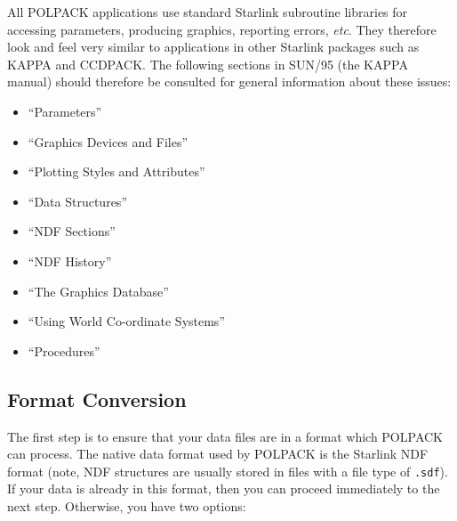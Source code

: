 \documentclass[twoside,11pt]{article}
\newcommand{\xref}[3]{#1}
\newcommand{\xlabel}[1]{}
\renewcommand{\_}{\texttt{\symbol{95}}}
\begin{document}
All POLPACK applications use standard Starlink subroutine libraries for
accessing parameters, producing graphics, reporting errors, \emph{etc}. They
therefore look and feel very similar to applications in other Starlink
packages such as KAPPA and CCDPACK. The following sections in
\xref{SUN/95}{sun95}{} (the KAPPA manual) should therefore be consulted for general
information about these issues:

\begin{itemize}
\item ``\xref{Parameters}{sun95}{se_param}''
\item ``\xref{Graphics Devices and Files}{sun95}{se_graphdev}''
\item ``\xref{Plotting Styles and Attributes}{sun95}{se_style}''
\item ``\xref{Data Structures}{sun95}{se_datastr}''
\item ``\xref{NDF Sections}{sun95}{se_ndfsect}''
\item ``\xref{NDF History}{sun95}{se_ndfhistory}''
\item ``\xref{The Graphics Database}{sun95}{se_agitate}''
\item ``\xref{Using World Co-ordinate Systems}{sun95}{se_wcsuse}''
\item ``\xref{Procedures}{sun95}{se_procedures}''
\end{itemize}

\subsection{\label{SEC:CONVERT}\xlabel{formatconversion}Format Conversion}

The first step is to ensure that your data files are in a format which
POLPACK can process. The native data format used by POLPACK is the
Starlink \xref{NDF}{sun33}{} format (note, NDF structures are usually
stored in files with a file type of \verb+.sdf+). If your data is already 
in this format, then you can proceed immediately to the next step. Otherwise, 
you have two options:
\end{document}
